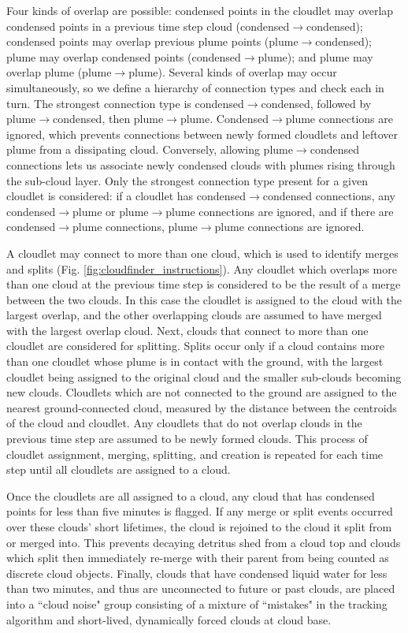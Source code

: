 \documentclass[acp]{copernicus}
\begin{document}
Four kinds of overlap are possible: condensed points in the cloudlet may 
overlap condensed points in a previous time step cloud 
(condensed$\rightarrow$condensed); condensed points may overlap previous 
plume points (plume$\rightarrow$condensed); plume may overlap condensed 
points (condensed$\rightarrow$plume); and plume may overlap plume 
(plume$\rightarrow$plume).  Several kinds of overlap may occur 
simultaneously, so we define a hierarchy of connection types and check each in 
turn.  The strongest connection type is condensed$\rightarrow$condensed, 
followed by plume$\rightarrow$condensed, then plume$\rightarrow$plume.  
Condensed$\rightarrow$plume connections are ignored, which prevents 
connections between newly formed cloudlets and leftover plume from a 
dissipating cloud.  Conversely, allowing plume$\rightarrow$condensed 
connections lets us associate newly condensed clouds with plumes rising through 
the sub-cloud layer.  Only the strongest connection type present for a given 
cloudlet is considered: if a cloudlet has condensed$\rightarrow$condensed 
connections, any condensed$\rightarrow$plume or plume$\rightarrow$plume 
connections are ignored, and if there are condensed$\rightarrow$plume 
connections, plume$\rightarrow$plume connections are ignored.  

A cloudlet may connect to more than one cloud, which is used to identify merges 
and splits (Fig. \ref{fig:cloudfinder_instructions}).  Any cloudlet which 
overlaps more than one cloud at the previous time step is considered to be the 
result of a merge between the two clouds.  In this case the cloudlet is 
assigned to the cloud with the largest overlap, and the other overlapping 
clouds are assumed to have merged with the largest overlap cloud.  Next, clouds 
that connect to more than one cloudlet are considered for splitting.  Splits 
occur only if a cloud contains more than one cloudlet whose plume is in contact 
with the ground, with the largest cloudlet being assigned to the original cloud 
and the smaller sub-clouds becoming new clouds. Cloudlets which are not 
connected to the ground are assigned to the nearest ground-connected cloud, 
measured by the distance between the centroids of the cloud and cloudlet.  Any 
cloudlets that do not overlap clouds in the previous time step are assumed to 
be newly formed clouds.  This process of cloudlet assignment, merging, 
splitting, and creation is repeated for each time step until all cloudlets are 
assigned to a cloud.
  
Once the cloudlets are all assigned to a cloud, any cloud that has condensed 
points for less than five minutes is flagged.  If any merge or split events 
occurred over these clouds' short lifetimes, the cloud is rejoined to the cloud 
it split from or merged into.  This prevents decaying detritus shed from a 
cloud top and clouds which split then immediately re-merge with their parent 
from being counted as discrete cloud objects.  Finally, clouds that have 
condensed liquid water for less than two minutes, and thus are unconnected to 
future or past clouds, are placed into a ``cloud noise" group consisting of a 
mixture of ``mistakes" in the tracking algorithm and short-lived, dynamically 
forced clouds at cloud base. 
\end{document}
